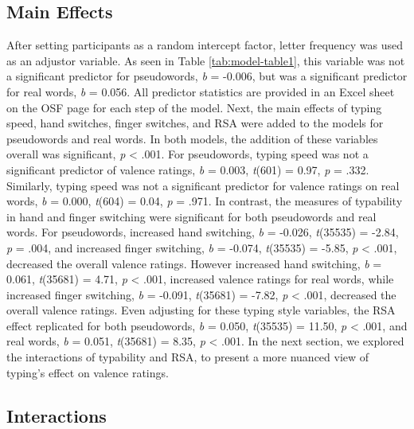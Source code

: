 \documentclass[english,man]{apa6}
\theoremstyle{definition}
\theoremstyle{definition}
\theoremstyle{definition}
\theoremstyle{remark}
\begin{document}
\subsection{Main Effects}\label{main-effects}

After setting participants as a random intercept factor, letter
frequency was used as an adjustor variable. As seen in Table
\ref{tab:model-table1}, this variable was not a significant predictor
for pseudowords, \emph{b} = -0.006, but was a significant predictor for
real words, \emph{b} = 0.056. All predictor statistics are provided in
an Excel sheet on the OSF page for each step of the model. Next, the
main effects of typing speed, hand switches, finger switches, and RSA
were added to the models for pseudowords and real words. In both models,
the addition of these variables overall was significant, \emph{p}
\textless{} .001. For pseudowords, typing speed was not a significant
predictor of valence ratings, \emph{b} = 0.003, \emph{t}(601) = 0.97,
\emph{p} = .332. Similarly, typing speed was not a significant predictor
for valence ratings on real words, \emph{b} = 0.000, \emph{t}(604) =
0.04, \emph{p} = .971. In contrast, the measures of typability in hand
and finger switching were significant for both pseudowords and real
words. For pseudowords, increased hand switching, \emph{b} = -0.026,
\emph{t}(35535) = -2.84, \emph{p} = .004, and increased finger
switching, \emph{b} = -0.074, \emph{t}(35535) = -5.85, \emph{p}
\textless{} .001, decreased the overall valence ratings. However
increased hand switching, \emph{b} = 0.061, \emph{t}(35681) = 4.71,
\emph{p} \textless{} .001, increased valence ratings for real words,
while increased finger switching, \emph{b} = -0.091, \emph{t}(35681) =
-7.82, \emph{p} \textless{} .001, decreased the overall valence ratings.
Even adjusting for these typing style variables, the RSA effect
replicated for both pseudowords, \emph{b} = 0.050, \emph{t}(35535) =
11.50, \emph{p} \textless{} .001, and real words, \emph{b} = 0.051,
\emph{t}(35681) = 8.35, \emph{p} \textless{} .001. In the next section,
we explored the interactions of typability and RSA, to present a more
nuanced view of typing's effect on valence ratings.

\subsection{Interactions}\label{interactions}
\end{document}

